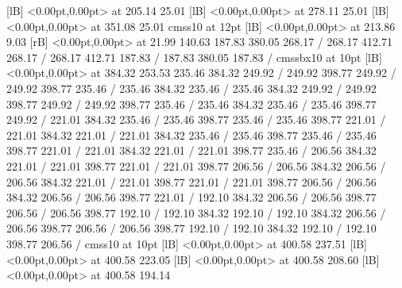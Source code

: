 {  [lB] <0.00pt,0.00pt> at 205.14 25.01
  [lB] <0.00pt,0.00pt> at 278.11 25.01
  [lB] <0.00pt,0.00pt> at 351.08 25.01
\font\picfont cmss10 at 12pt\picfont
{}  [lB] <0.00pt,0.00pt> at 213.86 9.03
 [rB] <0.00pt,0.00pt> at 21.99 140.63
\setsolid
{} 187.83 380.05 268.17 /
 268.17 412.71 268.17 /
 268.17 412.71 187.83 /
 187.83 380.05 187.83 /
\font\picfont cmssbx10 at 10pt\picfont
{}  [lB] <0.00pt,0.00pt> at 384.32 253.53
\setsolid
{} 235.46 384.32 249.92 /
 249.92 398.77 249.92 /
 249.92 398.77 235.46 /
 235.46 384.32 235.46 /
\setsolid
{} 235.46 384.32 249.92 /
 249.92 398.77 249.92 /
 249.92 398.77 235.46 /
 235.46 384.32 235.46 /
\setsolid
{} 235.46 398.77 249.92 /
\setsolid
{} 221.01 384.32 235.46 /
 235.46 398.77 235.46 /
 235.46 398.77 221.01 /
 221.01 384.32 221.01 /
\setsolid
{} 221.01 384.32 235.46 /
 235.46 398.77 235.46 /
 235.46 398.77 221.01 /
 221.01 384.32 221.01 /
\setsolid
{} 221.01 398.77 235.46 /
\setsolid
{} 206.56 384.32 221.01 /
 221.01 398.77 221.01 /
 221.01 398.77 206.56 /
 206.56 384.32 206.56 /
\setsolid
{} 206.56 384.32 221.01 /
 221.01 398.77 221.01 /
 221.01 398.77 206.56 /
 206.56 384.32 206.56 /
\setsolid
{} 206.56 398.77 221.01 /
\setsolid
{} 192.10 384.32 206.56 /
 206.56 398.77 206.56 /
 206.56 398.77 192.10 /
 192.10 384.32 192.10 /
\setsolid
{} 192.10 384.32 206.56 /
 206.56 398.77 206.56 /
 206.56 398.77 192.10 /
 192.10 384.32 192.10 /
\setsolid
{} 192.10 398.77 206.56 /
\font\picfont cmss10 at 10pt\picfont
{}  [lB] <0.00pt,0.00pt> at 400.58 237.51
  [lB] <0.00pt,0.00pt> at 400.58 223.05
  [lB] <0.00pt,0.00pt> at 400.58 208.60
  [lB] <0.00pt,0.00pt> at 400.58 194.14
\endpicture
}

